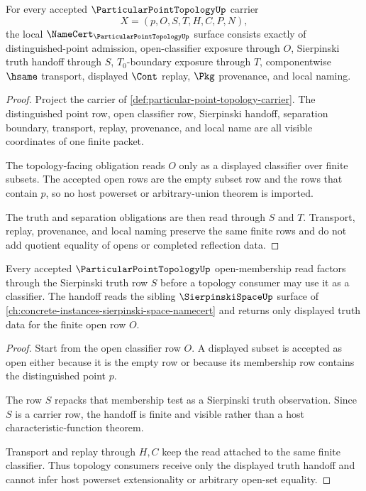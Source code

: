 \begin{theorem}
\label{thm:particular-point-topology-namecert-obligations}
For every accepted $\ParticularPointTopologyUp$ carrier
$$
X=(p,O,S,T,H,C,P,N),
$$
the local $\NameCert_{\ParticularPointTopologyUp}$ surface consists exactly of distinguished-point admission, open-classifier exposure through $O$, Sierpinski truth handoff through $S$, $T_0$-boundary exposure through $T$, componentwise $\hsame$ transport, displayed $\Cont$ replay, $\Pkg$ provenance, and local naming.
\end{theorem}
\begin{proof}
Project the carrier of \autoref{def:particular-point-topology-carrier}. The distinguished point row, open classifier row, Sierpinski handoff, separation boundary, transport, replay, provenance, and local name are all visible coordinates of one finite packet.

The topology-facing obligation reads $O$ only as a displayed classifier over finite subsets. The accepted open rows are the empty subset row and the rows that contain $p$, so no host powerset or arbitrary-union theorem is imported.

The truth and separation obligations are then read through $S$ and $T$. Transport, replay, provenance, and local naming preserve the same finite rows and do not add quotient equality of opens or completed reflection data.
\end{proof}

\begin{theorem}
\label{thm:particular-point-topology-sierpinski-handoff}
Every accepted $\ParticularPointTopologyUp$ open-membership read factors through the Sierpinski truth row $S$ before a topology consumer may use it as a classifier. The handoff reads the sibling $\SierpinskiSpaceUp$ surface of \autoref{ch:concrete-instances-sierpinski-space-namecert} and returns only displayed truth data for the finite open row $O$.
\end{theorem}
\begin{proof}
Start from the open classifier row $O$. A displayed subset is accepted as open either because it is the empty row or because its membership row contains the distinguished point $p$.

The row $S$ repacks that membership test as a Sierpinski truth observation. Since $S$ is a carrier row, the handoff is finite and visible rather than a host characteristic-function theorem.

Transport and replay through $H,C$ keep the read attached to the same finite classifier. Thus topology consumers receive only the displayed truth handoff and cannot infer host powerset extensionality or arbitrary open-set equality.
\end{proof}

